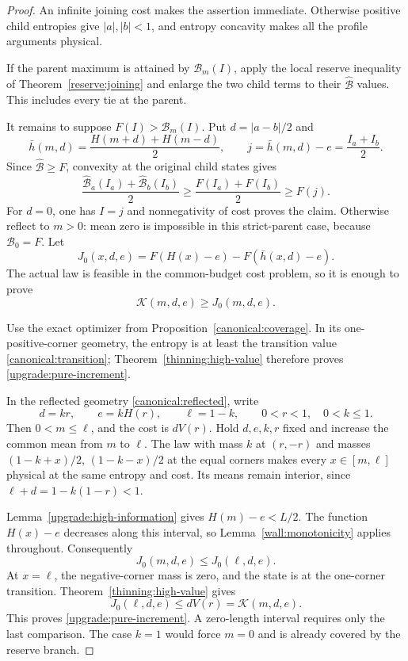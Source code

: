 \begin{proof}
An infinite joining cost makes the assertion immediate. Otherwise
positive child entropies give $|a|,|b|<1$, and entropy concavity
makes all the profile arguments physical.

If the parent maximum is attained by $\mathcal B_m(I)$, apply
the local reserve inequality of Theorem~\ref{reserve:joining}
and enlarge the two child terms to their
$\widehat{\mathcal B}$ values. This includes every tie at the
parent.

It remains to suppose $F(I)>\mathcal B_m(I)$. Put
$d=|a-b|/2$ and
\[
 \bar h(m,d)=\frac{H(m+d)+H(m-d)}2,
 \qquad j=\bar h(m,d)-e=\frac{I_a+I_b}{2}.
\]
Since $\widehat{\mathcal B}\ge F$, convexity at the original
child states gives
\begin{equation}
 \frac{\widehat{\mathcal B}_a(I_a)
             +\widehat{\mathcal B}_b(I_b)}2
 \ge\frac{F(I_a)+F(I_b)}2\ge F(j).
 \label{upgrade:original-child-pooling}
\end{equation}
For $d=0$, one has $I=j$ and nonnegativity of cost proves the
claim. Otherwise reflect to $m>0$: mean zero is impossible in
this strict-parent case, because $\mathcal B_0=F$.
Let
\[
 J_0(x,d,e)=F(H(x)-e)-F(\bar h(x,d)-e).
\]
The actual law is feasible in the common-budget cost problem, so
it is enough to prove
\begin{equation}
 \mathcal K(m,d,e)\ge J_0(m,d,e).
 \label{upgrade:pure-increment}
\end{equation}

Use the exact optimizer from
Proposition~\ref{canonical:coverage}. In its one-positive-corner
geometry, the entropy is at least the transition value
\eqref{canonical:transition}; Theorem~\ref{thinning:high-value}
therefore proves \eqref{upgrade:pure-increment}.

In the reflected geometry \eqref{canonical:reflected}, write
\[
 d=kr,\qquad e=kH(r),\qquad \ell=1-k,
 \qquad 0<r<1,\quad0<k\le1.
\]
Then $0<m\le\ell$, and the cost is $dV(r)$. Hold $d,e,k,r$
fixed and increase the common mean from $m$ to $\ell$.
The law with mass $k$ at $(r,-r)$ and masses
$(1-k+x)/2$, $(1-k-x)/2$ at the equal corners makes every
$x\in[m,\ell]$ physical at the same entropy and cost.
Its means remain interior, since
$\ell+d=1-k(1-r)<1$.

Lemma~\ref{upgrade:high-information} gives $H(m)-e<L/2$.
The function $H(x)-e$ decreases along this interval, so
Lemma~\ref{wall:monotonicity} applies throughout. Consequently
\[
 J_0(m,d,e)\le J_0(\ell,d,e).
\]
At $x=\ell$, the negative-corner mass is zero, and the state is
at the one-corner transition. Theorem~\ref{thinning:high-value}
gives
\[
 J_0(\ell,d,e)\le dV(r)=\mathcal K(m,d,e).
\]
This proves \eqref{upgrade:pure-increment}. A zero-length
interval requires only the last comparison. The case $k=1$
would force $m=0$ and is already covered by the reserve branch.


\end{proof}

